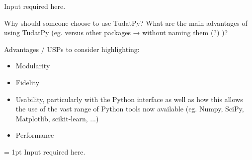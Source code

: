 \lbrack Input required here.\rbrack

Why should someone choose to use TudatPy?
What are the main advantages of using TudatPy (eg. versus other packages → without naming them (?) )?

Advantages / USPs to consider highlighting:
\begin{itemize}
    \item Modularity
    \item Fidelity
    \item Usability, particularly with the Python interface as well as how this allows the use of the vast range of Python tools now available (eg. Numpy, SciPy, Matplotlib, scikit-learn, ...)
    \item Performance
\end{itemize}

\fboxrule = 1pt
    \lbrack Input required here.\rbrack

